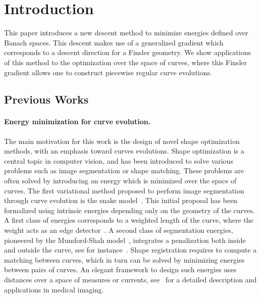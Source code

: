 \section{Introduction}

This paper introduces a new descent method to minimize energies defined over Banach spaces. This descent makes use of a generalized gradient which corresponds to a descent direction for a Finsler geometry. We show applications of this method to the optimization over the space of curves, where this Finsler gradient allows one to construct piecewise regular curve evolutions.


\subsection{Previous Works} 
\label{sec-previous-works}

\paragraph{Energy minimization for curve evolution.}

The main motivation for this work is the design of novel shape optimization methods, with an emphasis toward curves evolutions. Shape optimization is a central topic in computer vision, and has been introduced to solve various problems such as image segmentation or shape matching. These problems are often solved by introducing an energy which is minimized over the space of curves.  The first variational method proposed to perform image segmentation through curve evolution is the snake model~\cite{Kass88Snakes}. This initial proposal has been formalized using intrinsic energies depending only on the geometry of the curves. A first class of energies corresponds to a weighted length of the curve, where the weight acts as an edge detector~\cite{caselles-active-contours,malladi-shape-modeling}. A second class of segmentation energies, pioneered by the Mumford-Shah model~\cite{MumfordShah89}, integrates a penalization both inside and outside the curve, see for instance~\cite{CV-01}. Shape registration requires to compute a matching between curves, which in turn can be solved by minimizing energies between pairs of curves. An elegant framework to design such energies uses distances over a space of measures or currents, see~\cite{Glaunes-matching} for a detailed description and applications in medical imaging.

